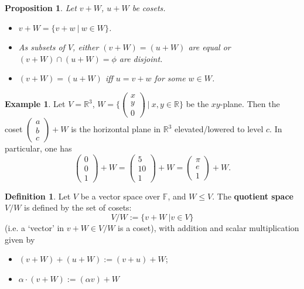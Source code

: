 \documentclass[11pt,openany]{book}
\theoremstyle{plain}
\newtheorem{proposition}[proposition]{Proposition}
\theoremstyle{definition}
\newtheorem{definition}[definition]{Definition}
\newtheorem{example}[example]{Example}
\theoremstyle{remark}
\begin{document}
\begin{proposition} \label{prop-samecoset}
Let $v + W$, $u + W$ be cosets.
\begin{itemize}
    \item $v + W = \{v + w\ |\ w \in W\}$.
    \item As subsets of $V$, either $(v + W) = (u + W)$ are equal or $(v + W) \cap (u + W) = \phi$ are disjoint.
    \item $(v + W) = (u + W)$ iff $u = v+w$ for some $w \in W$.
\end{itemize}
\end{proposition}

\begin{example} \label{eg-xyplane}
    Let $V = \mathbb{R}^3$, $W = \{\begin{pmatrix} x \\ y \\ 0 \end{pmatrix}\ |\ x,y \in \mathbb{R}\}$ be the $xy$-plane. Then the coset
    $\begin{pmatrix} a \\ b \\ c \end{pmatrix} + W$ is the horizontal plane in $\mathbb{R}^3$ elevated/lowered to level $c$. In particular, one has
    $$\begin{pmatrix} 0 \\ 0 \\ 1 \end{pmatrix} + W = \begin{pmatrix} 5 \\ 10 \\ 1 \end{pmatrix} + W = \begin{pmatrix} \pi \\ e \\ 1 \end{pmatrix} + W.$$
\end{example}

\begin{definition}
    Let $V$ be a vector space over $\mathbb{F}$, and $W \leq V$. The {\bf quotient space} $V/W$ is defined by the set of cosets:
    $$V/W := \{v + W\ | v \in V\}$$
    (i.e. a `vector' in $v + W \in V/W$ is a coset), with addition and scalar multiplication given by
    \begin{itemize}
        \item $(v+W)+(u+W) := (v+u)+W$;
        \item $\alpha \cdot (v+W) := (\alpha v) + W$
    \end{itemize}
\end{definition}
\end{document}
